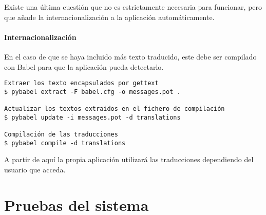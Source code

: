 Existe una última cuestión que no es estrictamente necesaria para funcionar, pero
que añade la internacionalización a la aplicación automáticamente.

\paragraph{Internacionalización} En el caso de que se haya incluido más texto
traducido, este debe ser compilado con Babel para que la aplicación pueda
detectarlo.

\begin{tcolorbox}[colback=cyan!5!white,colframe=cyan!75!black,fontupper=\footnotesize,title=Proceso de internacionalización (desde /web)]
\begin{verbatim}
Extraer los texto encapsulados por gettext
$ pybabel extract -F babel.cfg -o messages.pot . 

Actualizar los textos extraidos en el fichero de compilación
$ pybabel update -i messages.pot -d translations

Compilación de las traducciones
$ pybabel compile -d translations 
\end{verbatim}
\end{tcolorbox}
 
A partir de aquí la propia aplicación utilizará las traducciones dependiendo del
usuario que acceda.

\clearpage
\section{Pruebas del sistema}
